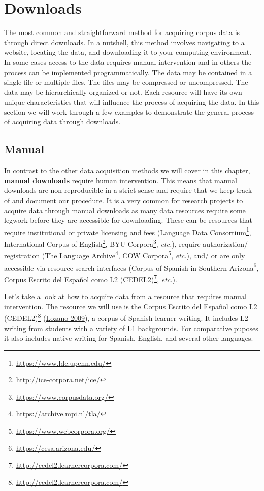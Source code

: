 \documentclass[
  letterpaper,
  DIV=11,
  numbers=noendperiod]{scrreport}
\theoremstyle{definition}
\theoremstyle{remark}
\DeclareRobustCommand{\href}[2]{#2\footnote{\url{#1}}}
\begin{document}
\hypertarget{downloads}{%
\section{Downloads}\label{downloads}}

The most common and straightforward method for acquiring corpus data is
through direct downloads. In a nutshell, this method involves navigating
to a website, locating the data, and downloading it to your computing
environment. In some cases access to the data requires manual
intervention and in others the process can be implemented
programmatically. The data may be contained in a single file or multiple
files. The files may be compressed or uncompressed. The data may be
hierarchically organized or not. Each resource will have its own unique
characteristics that will influence the process of acquiring the data.
In this section we will work through a few examples to demonstrate the
general process of acquiring data through downloads.

\hypertarget{manual}{%
\subsection{Manual}\label{manual}}

In contrast to the other data acquisition methods we will cover in this
chapter, \textbf{manual downloads} require human intervention. This
means that manual downloads are non-reproducible in a strict sense and
require that we keep track of and document our procedure. It is a very
common for research projects to acquire data through manual downloads as
many data resources require some legwork before they are accessible for
downloading. These can be resources that require institutional or
private licensing and fees (\href{https://www.ldc.upenn.edu/}{Language
Data Consortium}, \href{http://ice-corpora.net/ice/}{International
Corpus of English}, \href{https://www.corpusdata.org/}{BYU Corpora},
\emph{etc.}), require authorization/ registration
(\href{https://archive.mpi.nl/tla/}{The Language Archive},
\href{https://www.webcorpora.org/}{COW Corpora}, \emph{etc.}), and/ or
are only accessible via resource search interfaces
(\href{https://cesa.arizona.edu/}{Corpus of Spanish in Southern
Arizona}, \href{http://cedel2.learnercorpora.com/}{Corpus Escrito del
Español como L2 (CEDEL2)}, \emph{etc.}).

Let's take a look at how to acquire data from a resource that requires
manual intervention. The resource we will use is the
\href{http://cedel2.learnercorpora.com/}{Corpus Escrito del Español como
L2 (CEDEL2)} (\protect\hyperlink{ref-Lozano2009}{Lozano 2009}), a corpus
of Spanish learner writing. It includes L2 writing from students with a
variety of L1 backgrounds. For comparative puposes it also includes
native writing for Spanish, English, and several other languages.
\end{document}
